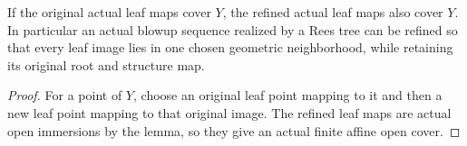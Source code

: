 \begin{corollary}\label{cor:sc0-rees-subordinate-affine-cover}
\leanok
{}
If the original actual leaf maps cover $Y$, the refined actual leaf maps also
cover $Y$. In particular an actual blowup sequence realized by a Rees tree can
be refined so that every leaf image lies in one chosen geometric neighborhood,
while retaining its original root and structure map.
\end{corollary}
\begin{proof}
For a point of $Y$, choose an original leaf point mapping to it and then a new
leaf point mapping to that original image. The refined leaf maps are actual
open immersions by the lemma, so they give an actual finite affine open cover.
\end{proof}
